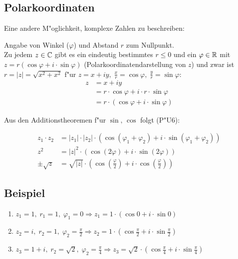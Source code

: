 
\subsection{Polarkoordinaten}

Eine andere M"oglichkeit, komplexe Zahlen zu beschreiben:

Angabe von Winkel ($\varphi$) und Abstand $r$ zum Nullpunkt.\\
Zu jedem $z \in \mathbb{C}$ gibt es ein eindeutig bestimmtes $r \leq 0$ und ein $\varphi \in \mathbb{R}$ mit \\$z=r(\cos\varphi+i \cdot \sin \varphi)$ (Polarkoordinatendarstellung von $z$) und zwar ist $r=|z|=\sqrt{x^2 + x^2}$ f"ur $z = x + iy, \;\frac{x}{r}= \cos\varphi, \; \frac{y}{r}=\sin \varphi$:
\begin{align*}
	z &= x +iy\\
	&= r \cdot \cos\varphi + i \cdot r \cdot \sin\varphi\\
	&= r \cdot (\cos\varphi + i \cdot\sin\varphi)
\end{align*}

Aus den Additionstheoremen f"ur $\sin, \, \cos$ folgt (P"U6):

\begin{align*}
z_1 \cdot z_2 &= |z_1| \cdot |z_2|\cdot (\cos(\varphi_1 + \varphi_2)+i \cdot \sin(\varphi_1 + \varphi_2))\\
z^2 &= |z|^2 \cdot (\cos(2\varphi)+ i \cdot \sin(2\varphi))\\
\pm \sqrt{z} &= \sqrt{|z|} \cdot (\cos (\frac{\varphi}{2}) + i \cdot \cos (\frac{\varphi}{2}))
\end{align*}

\subsection{Beispiel}
\begin{enumerate}
	\item
	$z_1=1,\; r_1=1, \; \varphi_1= 0 \Rightarrow z_1 = 1 \cdot (\cos 0+ i \cdot \sin 0 )$
	\item
	$z_2=i, \; r_2=1, \; \varphi_2=\frac{\pi}{2}\Rightarrow z_2 = 1 \cdot (\cos \frac{\pi}{2}+ i \cdot \sin \frac{\pi}{2} )$
	\item
	$z_3=1+i, \; r_2=\sqrt{2}, \; \varphi_2=\frac{\pi}{4}\Rightarrow z_3 = \sqrt{2} \cdot (\cos \frac{\pi}{4}+ i \cdot \sin \frac{\pi}{4} )$
\end{enumerate}

